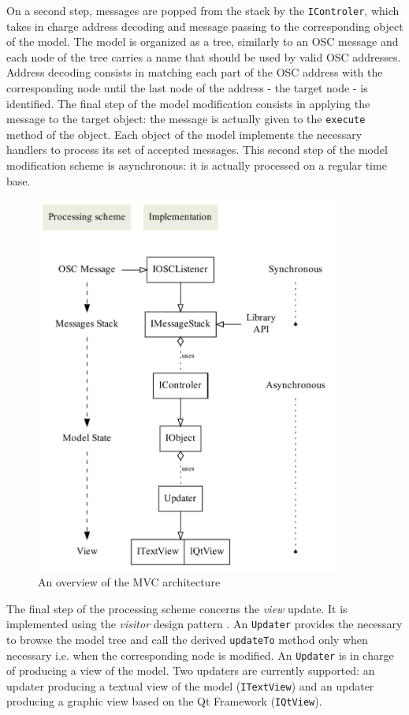 \documentclass[a4paper]{article}
\begin{document}
On a second step, messages are popped from the stack by the \texttt{IControler}, which takes in charge address decoding and message passing to the corresponding object of the model. The model is organized as a tree, similarly to an OSC message and each node of the tree carries a name that should be used by valid OSC addresses. Address decoding consists in matching each part of the OSC address with the corresponding node until the last node of the address - the target node - is identified. 
The final step of the model modification consists in applying the message to the target object: the message is actually given to the \texttt{execute} method of the object. Each object of the model implements the necessary handlers to process its set of accepted messages. 
This second step of the model modification scheme is asynchronous: it is actually processed on a regular time base.

\begin{figure}[h]
	\centering \includegraphics[width=100mm]{rsrc/mvc}
 \caption{An overview of the MVC architecture}
 \label{mvc}
\end{figure}

The final step of the processing scheme concerns the \emph{view} update. It is implemented using the \emph{visitor} design pattern \cite{DP95}. An \texttt{Updater} provides the necessary to browse the model tree and call the derived \texttt{updateTo} method only when necessary i.e. when the corresponding node is modified. An \texttt{Updater} is in charge of producing a view of the model. Two updaters are currently supported: an updater producing a textual view of the model (\texttt{ITextView}) and an updater producing a graphic view based on the Qt Framework (\texttt{IQtView}).
\end{document}
